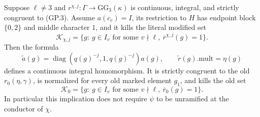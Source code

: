 \begin{lemma}
\label{AC-K29-kill}
Suppose $\ell\ne3$ and $r^{\chi,j}:\Gamma\to\mathrm{GG}_3(\kappa)$
is continuous, integral, and strictly congruent to (GP.3).
Assume $a(c_c)=I$, its restriction to $H$ has endpoint block
$\{0,2\}$ and middle character $1$, and it kills the literal
modified set
\[
 \mathcal K_{\chi,j}=
 \{g:\ g\in I_v\text{ for some }v\nmid\ell,
                   \ \overline r^{\chi,j}(g)=1\}.            \tag{GP.4}
\]
Then the formula
\[
 \widetilde a(g)
   =\operatorname{diag}(q(g)^{-j},1,q(g)^{-j})a(g),
 \qquad \widetilde r(g).\mathrm{mult}=\eta(g)                \tag{GP.5}
\]
defines a continuous integral homomorphism.  It is strictly
congruent to the old $r_0(\eta,\gamma)$, is normalized for every
old marked element $g_1$, and kills the old set
\[
 \mathcal K_0=\{g:\ g\in I_v\text{ for some }v\nmid\ell,
                         \ \overline r_0(g)=1\}.             \tag{GP.6}
\]
In particular this implication does not require $\psi$ to be
unramified at the conductor of $\chi$.
\end{lemma}
